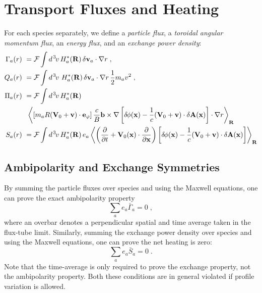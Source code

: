 \section{Transport Fluxes and Heating}

For each species separately, we define a {\it particle flux}, 
a {\it toroidal angular momentum flux}, an {\it energy flux}, 
and an {\it exchange power density}:
%
\begin{align}
\Gamma_a(r) &~= {\cal F} \int d^{\hskip 1pt 3} \hskip -1pt v \, H_a^*(\mathbf{R}) \, 
  \delta {\bf v}_a \cdot\nabla r \; , \\
Q_a(r) &~= {\cal F} \int d^{\hskip 1pt 3} \hskip -1pt v \, \, H_a^*(\mathbf{R}) \, 
  \delta {\bf v}_a\cdot\nabla r \, \frac{1}{2} m_a v^2 \; , \\
\Pi_a(r) &~= {\cal F} \int d^{\hskip 1pt 3} \hskip -1pt v \, H_a^*(\mathbf{R}) \nonumber \\
&~~\left< \left[ m_a R ( {\bf V}_0 + \mathbf{v} ) \cdot {\bf e}_\varphi \right] 
  \frac{c}{B} \mathbf{b} \times \nabla \left[ 
  \delta \hskip -1pt \phi({\bf x})-\frac{1}{c}({\bf V}_0 + \mathbf{v}) \cdot 
\delta {\bf A}({\bf x}) \right] \cdot \nabla r \right>_{\mathbf{R}} \\
S_a(r) &~= {\cal F} \int d^{\hskip 1pt 3} \hskip -1pt v \, H_a^*(\mathbf{R}) \, e_a 
\left< \left( \frac{\partial}{\partial t} + {\bf V}_0({\bf x}) 
\cdot \frac{\partial}{\partial{\bf x}} \right)  
\left[ \delta \hskip -1pt \phi({\bf x})-\frac{1}{c}({\bf V}_0 + \mathbf{v}) \cdot 
\delta {\bf A}({\bf x}) \right] \right>_{\mathbf{R}}
\end{align}

\subsection{Ambipolarity and Exchange Symmetries}

By summing the particle fluxes over species and using the Maxwell 
equations, one can prove the exact ambipolarity property
%
\begin{equation}
\sum_a e_a {\bar \Gamma}_a = 0 \; ,
\end{equation}
%
where an overbar denotes a perpendicular spatial and time average 
taken in the flux-tube limit.  Similarly, summing the exchange power 
density over species and using the Maxwell equations, one can prove
the net heating is zero:
%
\begin{equation}
\sum_a e_a {\bar S}_a = 0 \; .
\end{equation}
%
Note that the time-average is only required to prove the exchange 
property, not the ambipolarity property.  Both these conditions are 
in general violated if profile variation is allowed.

